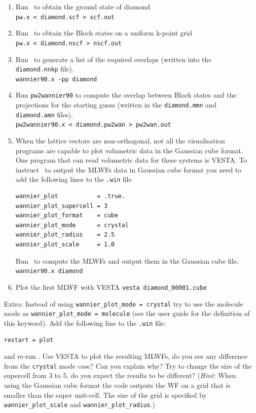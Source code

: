 \documentclass[a4paper,11pt,twoside]{article}
\begin{document}
\begin{enumerate}
\item Run \pwscf\ to obtain the ground state of diamond\\
{\tt pw.x < diamond.scf > scf.out}

\item Run \pwscf\ to obtain the Bloch states on a uniform k-point grid\\
{\tt pw.x < diamond.nscf > nscf.out}

\item Run \wannier\ to generate a list of the required overlaps (written
  into the {\tt diamond.nnkp} file).\\ 
{\tt wannier90.x -pp diamond}

\item Run {\tt pw2wannier90} to compute the overlap between Bloch
  states and the projections for the starting guess (written in the
  {\tt diamond.mmn} and {\tt diamond.amn} files).\\  
{\tt pw2wannier90.x < diamond.pw2wan > pw2wan.out}

\item When the lattice vectors are non-orthogonal, not all the visualisation programs are capable to plot volumetric data in the Gaussian cube format. 
One program that can read volumetric data for these systems is VESTA. 
To instruct \wannier\ to output the MLWFs data in Gaussian cube format you need to add the following lines to the {\tt .win} file
\begin{verbatim}
wannier_plot           = .true.
wannier_plot_supercell = 3
wannier_plot_format    = cube
wannier_plot_mode      = crystal
wannier_plot_radius    = 2.5
wannier_plot_scale     = 1.0
\end{verbatim}
Run \wannier\ to compute the MLWFs and output them in the Gaussian cube file.\\
{\tt wannier90.x diamond}

\item Plot the first MLWF with VESTA
  {\tt vesta diamond\_00001.cube}
\end{enumerate}

Extra: Instead of using {\tt wannier\_plot\_mode = crystal} try to use the molecule mode as {\tt wannier\_plot\_mode = molecule} (see the user guide for the definition of this keyword).
Add the following line to the {\tt .win} file:
\begin{verbatim}
restart = plot
\end{verbatim}
and re-run \wannier. Use VESTA to plot the resulting MLWFs, do you see any difference from the {\tt crystal} mode case? Can you explain why?
Try to change the size of the supercell from 3 to 5, do you expect the results to be different? ({\it Hint:} When using the Gaussian cube format the code outputs the WF on a grid that is smaller than the super
unit-cell. The size of the grid is specified by {\tt wannier\_plot\_scale} and {\tt wannier\_plot\_radius}.)
\end{document}
